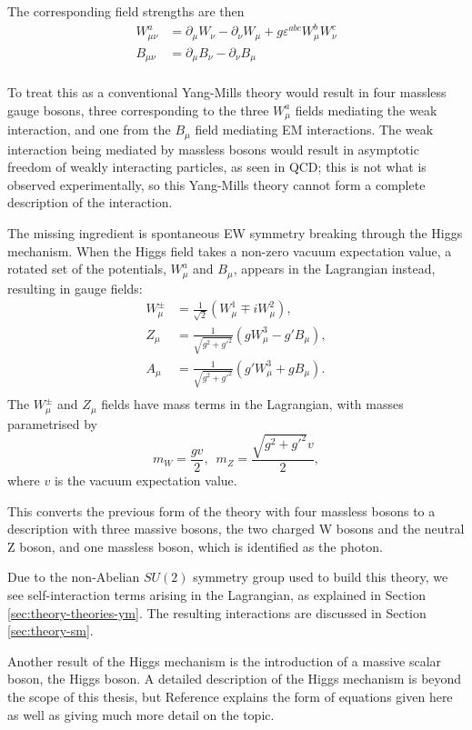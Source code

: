 The corresponding field strengths are then
\begin{equation*}
  \begin{split}
  W^a_{\mu\nu} &= \partial_\mu W_\nu - \partial_\nu W_\mu
               + g \varepsilon^{abc}W^b_\mu W^c_\nu \\
  B_{\mu\nu}   &= \partial_\mu B_\nu - \partial_\nu B_\mu \\
  \end{split}
\end{equation*}

To treat this as a conventional Yang-Mills theory would result in four massless
gauge bosons, three corresponding to the three $W^a_\mu$ fields mediating the
weak interaction, and one from the $B_\mu$ field mediating \ac{EM} interactions.
The weak interaction being mediated by massless bosons would result in
asymptotic freedom of weakly interacting particles, as seen in \ac{QCD}; this is
not what is observed experimentally, so this Yang-Mills theory cannot form a
complete description of the interaction.

The missing ingredient is  spontaneous \ac{EW} symmetry breaking through the
Higgs mechanism. When the Higgs field takes a non-zero vacuum expectation value,
a rotated set of the potentials, $W^a_\mu$ and $B_\mu$, appears in the
Lagrangian instead, resulting in gauge fields:
\begin{equation*}
  \begin{split}
    W_\mu^\pm &= \frac1{\sqrt2} (W_\mu^1 \mp iW_\mu^2), \\
    Z_\mu     &= \frac1{\sqrt{g^2 + g'^2}}( gW_\mu^3 - g' B_\mu ), \\
    A_\mu     &= \frac1{\sqrt{g^2 + g'^2}}( g'W_\mu^3 + g B_\mu ). \\
  \end{split}
\end{equation*}
%
The $W^\pm_\mu$ and $Z_\mu$ fields have mass terms in the Lagrangian, with
masses parametrised by
\begin{equation*}
  m_W = \frac{gv}2, \,\,\, m_Z = \frac{\sqrt{g^2 + g'^2}v}2,
\end{equation*}
where $v$ is the vacuum expectation value.

This converts the previous form of the theory with four massless bosons to a
description with three massive bosons, the two charged W bosons and the
neutral Z boson, and one massless boson, which is identified as the photon.

Due to the non-Abelian $SU(2)$ symmetry group used to build this theory, we
see self-interaction terms arising in the Lagrangian, as explained in Section
\ref{sec:theory-theories-ym}. The resulting interactions are discussed in
Section \ref{sec:theory-sm}.

Another result of the Higgs mechanism is the introduction of a massive scalar
boson, the Higgs boson.  A detailed description of the Higgs mechanism is beyond
the scope of this thesis, but Reference \cite{Peskin1995} explains the form of
equations given here as well as giving much more detail on the topic.
